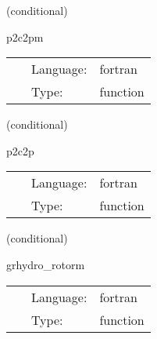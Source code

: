 \documentclass{article}
\begin{document}
\vspace{5mm}

   (conditional) 

\hspace{5mm} p2c2pm 

\hspace{5mm}{\it testing primitive to conservative to primitive - mhd version } 


\hspace{5mm}

 \begin{tabular*}{160mm}{cll} 
~ & Language:  & fortran \\ 
~ & Type:  & function \\ 
\end{tabular*} 


\vspace{5mm}

   (conditional) 

\hspace{5mm} p2c2p 

\hspace{5mm}{\it testing primitive to conservative to primitive } 


\hspace{5mm}

 \begin{tabular*}{160mm}{cll} 
~ & Language:  & fortran \\ 
~ & Type:  & function \\ 
\end{tabular*} 


\vspace{5mm}

   (conditional) 

\hspace{5mm} grhydro\_rotorm 

\hspace{5mm}{\it mhd rotor initial data } 


\hspace{5mm}

 \begin{tabular*}{160mm}{cll} 
~ & Language:  & fortran \\ 
~ & Type:  & function \\ 
\end{tabular*} 


\vspace{5mm}
\end{document}
